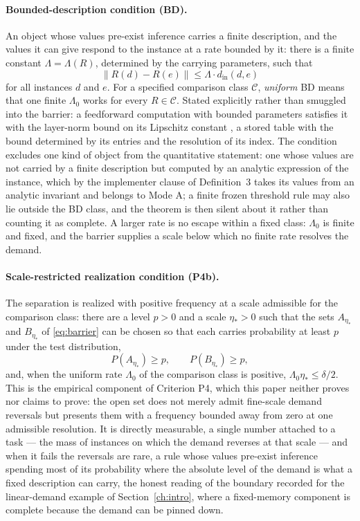 \paragraph{Bounded-description condition (BD).} An object whose values pre-exist inference carries a finite description, and the values it can give respond to the instance at a rate bounded by it: there is a finite constant $\Lambda = \Lambda (R)$, determined by the carrying parameters, such that
\begin{equation}
\| R(d) - R(e) \| \le \Lambda \cdot d_{\mathrm{in}} (d, e)
\label{eq:rate}
\end{equation}
for all instances $d$ and $e$. For a specified comparison class $\mathcal{C}$, \emph{uniform} BD means that one finite $\Lambda_0$ works for every $R \in \mathcal{C}$. Stated explicitly rather than smuggled into the barrier: a feedforward computation with bounded parameters satisfies it with the layer-norm bound on its Lipschitz constant \citep{virmaux2018}, a stored table with the bound determined by its entries and the resolution of its index. The condition excludes one kind of object from the quantitative statement: one whose values are not carried by a finite description but computed by an analytic expression of the instance, which by the implementer clause of Definition~3 takes its values from an analytic invariant and belongs to Mode A; a finite frozen threshold rule may also lie outside the BD class, and the theorem is then silent about it rather than counting it as complete. A larger rate is no escape within a fixed class: $\Lambda_0$ is finite and fixed, and the barrier supplies a scale below which no finite rate resolves the demand.

\paragraph{Scale-restricted realization condition (P4b).} The separation is realized with positive frequency at a scale admissible for the comparison class: there are a level $p > 0$ and a scale $\eta_* > 0$ such that the sets $A_{\eta_*}$ and $B_{\eta_*}$ of \eqref{eq:barrier} can be chosen so that each carries probability at least $p$ under the test distribution,
\begin{equation}
P (A_{\eta_*} ) \ge p , \qquad P (B_{\eta_*} ) \ge p ,
\label{eq:realization}
\end{equation}
and, when the uniform rate $\Lambda_0$ of the comparison class is positive, $\Lambda_0 \eta_* \le \delta / 2$. This is the empirical component of Criterion P4, which this paper neither proves nor claims to prove: the open set does not merely admit fine-scale demand reversals but presents them with a frequency bounded away from zero at one admissible resolution. It is directly measurable, a single number attached to a task --- the mass of instances on which the demand reverses at that scale --- and when it fails the reversals are rare, a rule whose values pre-exist inference spending most of its probability where the absolute level of the demand is what a fixed description can carry, the honest reading of the boundary recorded for the linear-demand example of Section~\ref{ch:intro}, where a fixed-memory component is complete because the demand can be pinned down.

